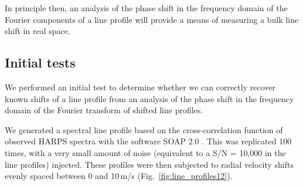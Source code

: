 In principle then, an  analysis of the phase shift in the frequency domain of the Fourier components of a line profile will provide a means of measuring a bulk line shift in real space. 



\subsection{Initial tests}
\label{sec:Initial_tests}

We performed an initial test to determine whether we can correctly recover known shifts of a line profile  
from an analysis of the phase shift in the frequency domain of the Fourier transform of shifted line profiles.

We generated a spectral line profile based on the cross-correlation function of observed HARPS spectra
with the software SOAP 2.0 \cite{Dumusque2014SOAP}. This was replicated 100 times, with a very small amount of 
noise (equivalent to a S/N = 10,000 in the line profiles) injected. These profiles were then
subjected to radial velocity shifts evenly spaced between 0 and 10\,m/s (Fig.~\ref{fig:line_profiles12}). 

